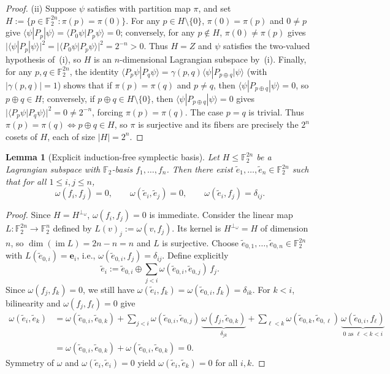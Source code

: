 \documentclass[11pt,a4paper]{article}
\theoremstyle{plain}
\newtheorem{lemma}{Lemma}[section]
\theoremstyle{definition}
\theoremstyle{remark}
\newcommand{\F}{\mathbb{F}}
\newcommand{\imOp}{\operatorname{im}}
\newcommand{\braket}[2]{\langle#1|#2\rangle}
\newcommand{\expval}[2]{\langle#1|#2|#1\rangle}
\newcommand{\abs}[1]{\lvert#1\rvert}
\numberwithin{equation}{section}
\begin{document}
\begin{proof}
(ii) Suppose $\psi$ satisfies  with partition map $\pi$, and set $H := \{p \in \F_2^{2n} : \pi(p) = \pi(0)\}$. For any $p \in H \setminus \{0\}$, $\pi(0) = \pi(p)$ and $0 \neq p$ give $\expval{\psi}{P_p} = \braket{P_0\psi}{P_p\psi} = 0$; conversely, for any $p \notin H$, $\pi(0) \neq \pi(p)$ gives $\abs{\expval{\psi}{P_p}}^2 = \abs{\braket{P_0\psi}{P_p\psi}}^2 = 2^{-n} > 0$. Thus $H = Z$ and $\psi$ satisfies the two-valued hypothesis of~(i), so $H$ is an $n$-dimensional Lagrangian subspace by~(i). Finally, for any $p, q \in \F_2^{2n}$, the identity $\braket{P_p\psi}{P_q\psi} = \gamma(p, q)\expval{\psi}{P_{p \oplus q}}$ (with $\abs{\gamma(p,q)} = 1$) shows that if $\pi(p) = \pi(q)$ and $p \neq q$, then $\expval{\psi}{P_{p \oplus q}} = 0$, so $p \oplus q \in H$; conversely, if $p \oplus q \in H \setminus \{0\}$, then $\expval{\psi}{P_{p \oplus q}} = 0$ gives $\abs{\braket{P_p\psi}{P_q\psi}}^2 = 0 \neq 2^{-n}$, forcing $\pi(p) = \pi(q)$. The case $p = q$ is trivial. Thus $\pi(p) = \pi(q) \iff p \oplus q \in H$, so $\pi$ is surjective and its fibers are precisely the $2^n$ cosets of $H$, each of size $\abs{H} = 2^n$.
\end{proof}

\begin{lemma}[Explicit induction-free symplectic basis]\label{lem:symp-basis}
Let $H \le \F_2^{2n}$ be a Lagrangian subspace with $\F_2$-basis $f_1, \dots, f_n$. Then there exist $\tilde{e}_1, \dots, \tilde{e}_n \in \F_2^{2n}$ such that for all $1 \le i, j \le n$,
\[
  \omega(f_i, f_j) = 0, \qquad \omega(\tilde{e}_i, \tilde{e}_j) = 0, \qquad \omega(\tilde{e}_i, f_j) = \delta_{ij}.
\]
\end{lemma}

\begin{proof}
Since $H = H^{\perp_\omega}$, $\omega(f_i, f_j) = 0$ is immediate. Consider the linear map $L : \F_2^{2n} \to \F_2^n$ defined by $L(v)_j := \omega(v, f_j)$. Its kernel is $H^{\perp_\omega} = H$ of dimension $n$, so $\dim(\imOp L) = 2n - n = n$ and $L$ is surjective. Choose $\tilde{e}_{0,1}, \dots, \tilde{e}_{0,n} \in \F_2^{2n}$ with $L(\tilde{e}_{0,i}) = \mathbf{e}_i$, i.e., $\omega(\tilde{e}_{0,i}, f_j) = \delta_{ij}$. Define explicitly
\[
  \tilde{e}_i := \tilde{e}_{0, i} \oplus \sum_{j < i} \omega(\tilde{e}_{0, i}, \tilde{e}_{0, j})\, f_j.
\]
Since $\omega(f_j, f_k) = 0$, we still have $\omega(\tilde{e}_i, f_k) = \omega(\tilde{e}_{0,i}, f_k) = \delta_{ik}$. For $k < i$, bilinearity and $\omega(f_j, f_\ell) = 0$ give
\begin{align*}
  \omega(\tilde{e}_i, \tilde{e}_k)
  &= \omega(\tilde{e}_{0,i}, \tilde{e}_{0,k})
   + \sum_{j < i} \omega(\tilde{e}_{0,i}, \tilde{e}_{0,j})\,\underbrace{\omega(f_j, \tilde{e}_{0,k})}_{\delta_{jk}}
   + \sum_{\ell < k} \omega(\tilde{e}_{0,k}, \tilde{e}_{0,\ell})\,\underbrace{\omega(\tilde{e}_{0,i}, f_\ell)}_{0 \text{ as } \ell < k < i} \\
  &= \omega(\tilde{e}_{0,i}, \tilde{e}_{0,k}) + \omega(\tilde{e}_{0,i}, \tilde{e}_{0,k}) = 0.
\end{align*}
Symmetry of $\omega$ and $\omega(\tilde{e}_i, \tilde{e}_i) = 0$ yield $\omega(\tilde{e}_i, \tilde{e}_k) = 0$ for all $i, k$.
\end{proof}
\end{document}
